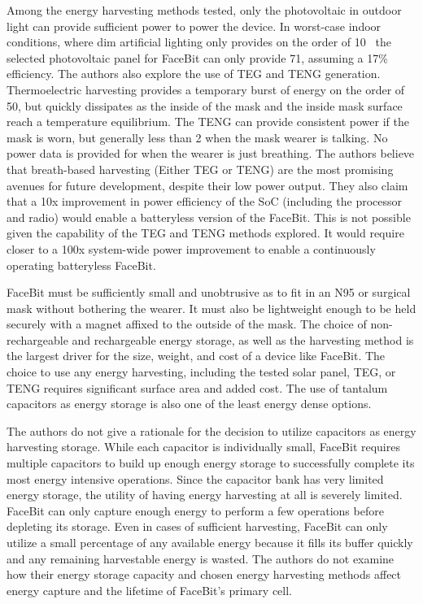 Among the energy harvesting methods tested, only the photovoltaic in outdoor light can provide sufficient power to power the device.
In worst-case indoor conditions, where dim artificial lighting only provides on the order of 10\ssi[per-mode=symbol]{\micro\watt\per\centi\meter\squared}~\cite{yervaGrafting12}
the selected photovoltaic panel for FaceBit can only provide 71\ssi{\micro\watt}, assuming a 17\% efficiency.
The authors also explore the use of TEG and TENG generation.
Thermoelectric harvesting provides a temporary burst of energy on the order of 50\ssi{\micro\watt}, but quickly dissipates as the inside of the mask and the inside mask surface reach a temperature equilibrium.
The TENG can provide consistent power if the mask is worn, but generally less than 2\ssi{\micro\watt} when the mask wearer is talking. No power data is provided for when the wearer is just breathing.
The authors believe that breath-based harvesting (Either TEG or TENG) are the most promising avenues for future development, despite their low power output.
They also claim that a 10x improvement in power efficiency of the SoC (including the processor and radio) would enable a batteryless version of the FaceBit.
This is not possible given the capability of the TEG and TENG methods explored. It would require closer to a 100x system-wide power improvement to enable a continuously operating batteryless FaceBit.

FaceBit must be sufficiently small and unobtrusive as to fit in an N95 or surgical mask without bothering the wearer.
It must also be lightweight enough to be held securely with a magnet affixed to the outside of the mask.
The choice of non-rechargeable and rechargeable energy storage, as well as the harvesting method is the largest driver for the size, weight, and cost of a device like FaceBit.
The choice to use any energy harvesting, including the tested solar panel, TEG, or TENG requires significant surface area and added cost.
The use of tantalum capacitors as energy storage is also one of the least energy dense options.

The authors do not give a rationale for the decision to utilize capacitors as energy harvesting storage.
While each capacitor is individually small, FaceBit requires multiple capacitors to build up enough energy storage to successfully complete its most energy intensive operations.
Since the capacitor bank has very limited energy storage, the utility of having energy harvesting at all is severely limited.
FaceBit can only capture enough energy to perform a few operations before depleting its storage. Even in cases of sufficient harvesting, FaceBit can only utilize a small percentage of any available energy because it fills its buffer quickly and any remaining harvestable energy is wasted.
The authors do not examine how their energy storage capacity and chosen energy harvesting methods affect energy capture and the lifetime of FaceBit's primary cell.

